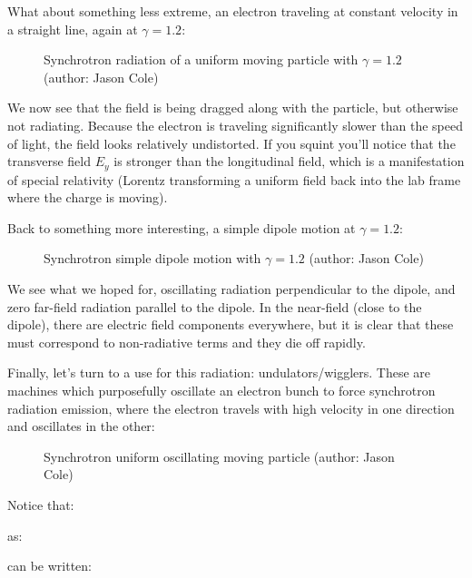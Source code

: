	What about something less extreme, an electron traveling at constant velocity in a straight line, again at $\gamma = 1.2$:
	\begin{figure}[H]
		\caption[Synchrotron radiation of a uniform moving particle with $\gamma=1.2$]{Synchrotron radiation of a uniform moving particle with $\gamma=1.2$ (author: Jason Cole)}
	\end{figure}
	We now see that the field is being dragged along with the particle, but otherwise not radiating. Because the electron is traveling significantly slower than the speed of light, the field looks relatively undistorted. If you squint you'll notice that the transverse field $E_y$ is stronger than the longitudinal field, which is a manifestation of special relativity (Lorentz transforming a uniform field back into the lab frame where the charge is moving).

	Back to something more interesting, a simple dipole motion at $\gamma = 1.2$:
	\begin{figure}[H]
		\caption{Synchrotron simple dipole motion with $\gamma=1.2$ (author: Jason Cole)}
	\end{figure}
	We see what we hoped for, oscillating radiation perpendicular to the dipole, and zero far-field radiation parallel to the dipole. In the near-field (close to the dipole), there are electric field components everywhere, but it is clear that these must correspond to non-radiative terms and they die off rapidly.

Finally, let’s turn to a use for this radiation: undulators/wigglers. These are machines which purposefully oscillate an electron bunch to force synchrotron radiation emission, where the electron travels with high velocity in one direction and oscillates in the other:
\begin{figure}[H]
		\caption{Synchrotron uniform oscillating moving particle (author: Jason Cole)}
	\end{figure}
	
	Notice that:
	
	as:
	
	can be written:
	
